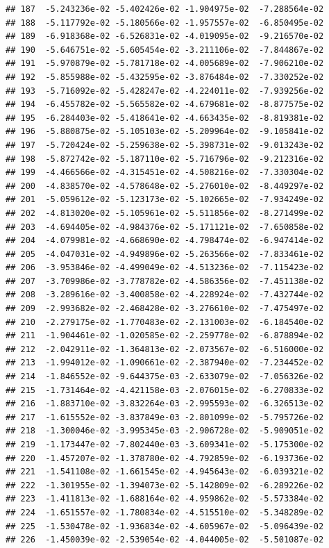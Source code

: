 \documentclass[
]{article}
\begin{document}
\begin{verbatim}
## 187  -5.243236e-02 -5.402426e-02 -1.904975e-02  -7.288564e-02
## 188  -5.117792e-02 -5.180566e-02 -1.957557e-02  -6.850495e-02
## 189  -6.918368e-02 -6.526831e-02 -4.019095e-02  -9.216570e-02
## 190  -5.646751e-02 -5.605454e-02 -3.211106e-02  -7.844867e-02
## 191  -5.970879e-02 -5.781718e-02 -4.005689e-02  -7.906210e-02
## 192  -5.855988e-02 -5.432595e-02 -3.876484e-02  -7.330252e-02
## 193  -5.716092e-02 -5.428247e-02 -4.224011e-02  -7.939256e-02
## 194  -6.455782e-02 -5.565582e-02 -4.679681e-02  -8.877575e-02
## 195  -6.284403e-02 -5.418641e-02 -4.663435e-02  -8.819381e-02
## 196  -5.880875e-02 -5.105103e-02 -5.209964e-02  -9.105841e-02
## 197  -5.720424e-02 -5.259638e-02 -5.398731e-02  -9.013243e-02
## 198  -5.872742e-02 -5.187110e-02 -5.716796e-02  -9.212316e-02
## 199  -4.466566e-02 -4.315451e-02 -4.508216e-02  -7.330304e-02
## 200  -4.838570e-02 -4.578648e-02 -5.276010e-02  -8.449297e-02
## 201  -5.059612e-02 -5.123173e-02 -5.102665e-02  -7.934249e-02
## 202  -4.813020e-02 -5.105961e-02 -5.511856e-02  -8.271499e-02
## 203  -4.694405e-02 -4.984376e-02 -5.171121e-02  -7.650858e-02
## 204  -4.079981e-02 -4.668690e-02 -4.798474e-02  -6.947414e-02
## 205  -4.047031e-02 -4.949896e-02 -5.263566e-02  -7.833461e-02
## 206  -3.953846e-02 -4.499049e-02 -4.513236e-02  -7.115423e-02
## 207  -3.709986e-02 -3.778782e-02 -4.586356e-02  -7.451138e-02
## 208  -3.289616e-02 -3.400858e-02 -4.228924e-02  -7.432744e-02
## 209  -2.993682e-02 -2.468428e-02 -3.276610e-02  -7.475497e-02
## 210  -2.279175e-02 -1.770483e-02 -2.131003e-02  -6.184540e-02
## 211  -1.904461e-02 -1.020585e-02 -2.259778e-02  -6.878894e-02
## 212  -2.042911e-02 -1.364813e-02 -2.073567e-02  -6.516000e-02
## 213  -1.994012e-02 -1.090661e-02 -2.387940e-02  -7.234452e-02
## 214  -1.846552e-02 -9.644375e-03 -2.633079e-02  -7.056326e-02
## 215  -1.731464e-02 -4.421158e-03 -2.076015e-02  -6.270833e-02
## 216  -1.883710e-02 -3.832264e-03 -2.995593e-02  -6.326513e-02
## 217  -1.615552e-02 -3.837849e-03 -2.801099e-02  -5.795726e-02
## 218  -1.300046e-02 -3.995345e-03 -2.906728e-02  -5.909051e-02
## 219  -1.173447e-02 -7.802440e-03 -3.609341e-02  -5.175300e-02
## 220  -1.457207e-02 -1.378780e-02 -4.792859e-02  -6.193736e-02
## 221  -1.541108e-02 -1.661545e-02 -4.945643e-02  -6.039321e-02
## 222  -1.301955e-02 -1.394073e-02 -5.142809e-02  -6.289226e-02
## 223  -1.411813e-02 -1.688164e-02 -4.959862e-02  -5.573384e-02
## 224  -1.651557e-02 -1.780834e-02 -4.515510e-02  -5.348289e-02
## 225  -1.530478e-02 -1.936834e-02 -4.605967e-02  -5.096439e-02
## 226  -1.450039e-02 -2.539054e-02 -4.044005e-02  -5.501087e-02

\end{verbatim}
\end{document}
